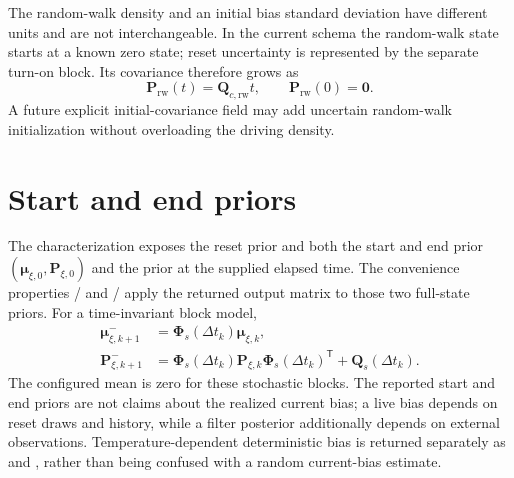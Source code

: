 \documentclass[11pt,oneside,headings=big]{scrreprt}
\newcommand{\mat}[1]{\bm{#1}}
\begin{document}
    The random-walk density and an initial bias standard deviation have different
    units and are not interchangeable. In the current schema the random-walk state
    starts at a known zero state; reset uncertainty is represented by the separate
    turn-on block. Its covariance therefore grows as
    \begin{equation}
        \mat P_{\mathrm{rw}}(t)=\mat Q_{c,\mathrm{rw}}t,
        \qquad \mat P_{\mathrm{rw}}(0)=\mat0.
    \end{equation}
    A future explicit initial-covariance field may add uncertain random-walk
    initialization without overloading the driving density.


    \section{Start and end priors}
    The characterization exposes the reset prior and both the start and end prior
    \((\boldsymbol\mu_{\xi,0},\mat P_{\xi,0})\) and the prior at the supplied
    elapsed time. The convenience properties
    / and
    / apply the
    returned output matrix to those two full-state priors. For a time-invariant
    block model,
    \begin{align}
        \boldsymbol\mu_{\xi,k+1}^{-}&=\mat\Phi_s(\Delta t_k)\boldsymbol\mu_{\xi,k},\\
        \mat P_{\xi,k+1}^{-}&=\mat\Phi_s(\Delta t_k)\mat P_{\xi,k}
        \mat\Phi_s(\Delta t_k)^{\mathsf T}+\mat Q_s(\Delta t_k).
        \label{eq:characterization-prior}
    \end{align}
    The configured mean is zero for these stochastic blocks. The reported start and
    end priors are not claims about the realized current bias; a live bias depends on
    reset draws and history, while a filter posterior additionally depends on
    external observations.
    Temperature-dependent deterministic bias is returned separately as
     and
    , rather than being confused with a
    random current-bias estimate.
\end{document}
